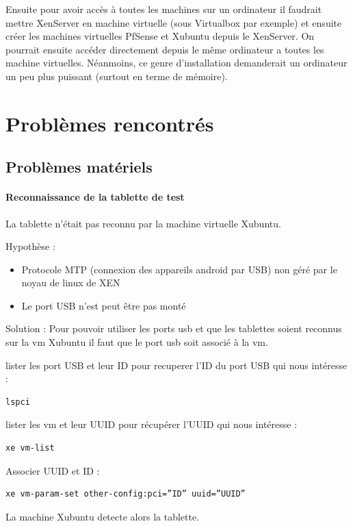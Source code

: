 \documentclass[a4paper,12pt]{extarticle}
\begin{document}
Ensuite pour avoir accès à toutes les machines sur un ordinateur il faudrait mettre XenServer en machine virtuelle (sous Virtualbox par exemple) et ensuite créer les machines virtuelles PfSense et Xubuntu depuis le XenServer. On pourrait ensuite accéder directement depuis le même ordinateur a toutes les machine virtuelles. Néanmoins, ce genre d’installation demanderait un ordinateur un peu plus puissant (surtout en terme de mémoire).


\clearpage
\section{Problèmes rencontrés}

\subsection{Problèmes matériels}

\paragraph{Reconnaissance de la tablette de test\\}

La tablette n’était pas reconnu par la machine virtuelle Xubuntu.

Hypothèse :
\begin{itemize}
\item Protocole MTP (connexion des appareils android par USB) non géré par le noyau de linux de XEN
\item Le port USB n’est peut être pas monté \\
\end{itemize}

Solution :
Pour pouvoir utiliser les ports usb et que les tablettes soient reconnus sur la vm Xubuntu il faut que le port usb soit associé à la vm. 

lister les port USB et leur ID pour recuperer l'ID du port USB qui nous intéresse :
\begin{verbatim}
lspci
\end{verbatim}

lister les vm et leur UUID pour récupérer l’UUID qui nous intéresse :
\begin{verbatim}
xe vm-list
\end{verbatim}

Associer UUID et ID :
\begin{verbatim}
xe vm-param-set other-config:pci=”ID” uuid=”UUID”
\end{verbatim}
La machine Xubuntu detecte alors la tablette.
\end{document}
